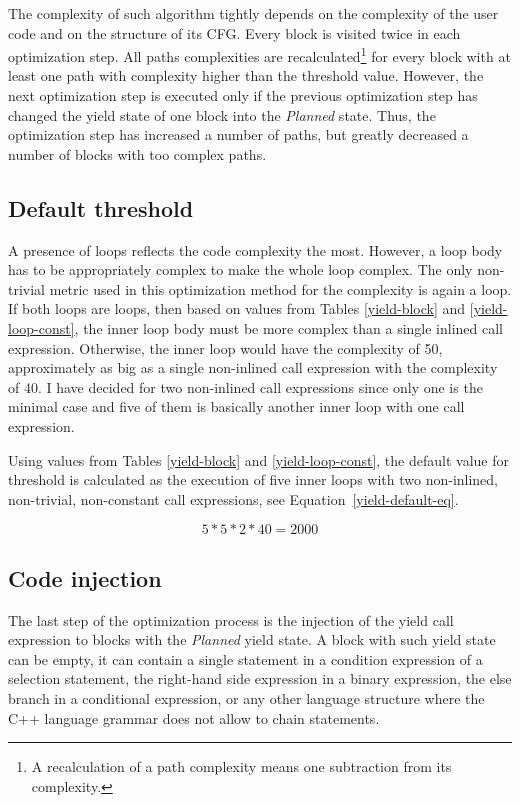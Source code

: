The complexity of such algorithm tightly depends on the complexity of the user code and on the structure of its CFG. Every block is visited twice in each optimization step. All paths complexities are recalculated\footnote{A recalculation of a path complexity means one subtraction from its complexity.} for every block with at least one path with complexity higher than the threshold value. However, the next optimization step is executed only if the previous optimization step has changed the yield state of one block into the \emph{Planned} state. Thus, the optimization step has increased a number of paths, but greatly decreased a number of blocks with too complex paths.

\subsection{Default threshold}
\label{yield-default}
A presence of loops reflects the code complexity the most. However, a loop body has to be appropriately complex to make the whole loop complex. The only non-trivial metric used in this optimization method for the complexity is again a loop. If both loops are  loops, then based on values from Tables \ref{yield-block} and \ref{yield-loop-const}, the inner loop body must be more complex than a single inlined call expression. Otherwise, the inner loop would have the complexity of 50, approximately as big as a single non-inlined call expression with the complexity of 40. I have decided for two non-inlined call expressions since only one is the minimal case and five of them is basically another inner loop with one call expression.

Using values from Tables \ref{yield-block} and \ref{yield-loop-const}, the default value for threshold is calculated as the execution of five inner  loops with two non-inlined, non-trivial, non-constant call expressions, see Equation~\ref{yield-default-eq}.

\begin{equation}
\label{yield-default-eq}
5 * 5 * 2 * 40 = 2000
\end{equation}

\subsection{Code injection}
The last step of the optimization process is the injection of the yield call expression to blocks with the \emph{Planned} yield state. A block with such yield state can be empty, it can contain a single statement in a condition expression of a selection statement, the right-hand side expression in a binary expression, the else branch in a conditional expression, or any other language structure where the C++ language grammar does not allow to chain statements.

